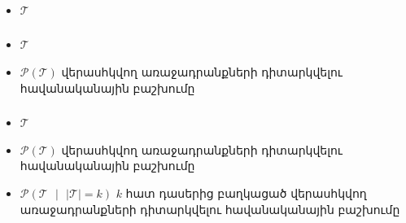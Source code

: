 \documentclass[10pt]{beamer}
\begin{document}
\begin{frame}[t]
\frametitle{}
\end{frame}

\begin{frame}[t]
\frametitle{}
\begin{itemize}
\vspace{8mm}
\item $\mathcal{T}$ 
\end{itemize}
\end{frame}


\begin{frame}[t]
\frametitle{}
\begin{itemize}
\vspace{8mm}
\item $\mathcal{T}$ 

\item $\mathcal{P}(\mathcal{T})$ վերասհկվող առաջադրանքների դիտարկվելու հավանականային բաշխումը
\end{itemize}
\end{frame}


\begin{frame}[t]
\frametitle{}
\begin{itemize}
\vspace{8mm}
\item $\mathcal{T}$ 

\item $\mathcal{P}(\mathcal{T})$ վերասհկվող առաջադրանքների դիտարկվելու հավանականային բաշխումը

\item $\mathcal{P}(\mathcal{T} \text{ } |\text{ }  |\mathcal{T}| = k )$ $k$ հատ դասերից բաղկացած վերասհկվող առաջադրանքների դիտարկվելու հավանականային բաշխումը
\end{itemize}
\end{frame}


\begin{frame}[t]
\frametitle{}
\end{frame}
\end{document}

